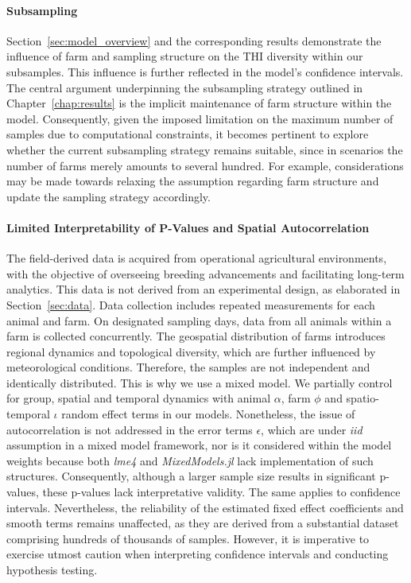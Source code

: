 \paragraph{Subsampling}
Section~\ref{sec:model_overview} and the corresponding results demonstrate the influence of farm and sampling structure on the THI diversity within our subsamples. This influence is further reflected in the model's confidence intervals. The central argument underpinning the subsampling strategy outlined in Chapter~\ref{chap:results} is the implicit maintenance of farm structure within the model. Consequently, given the imposed limitation on the maximum number of samples due to computational constraints, it becomes pertinent to explore whether the current subsampling strategy remains suitable, since in scenarios the number of farms merely amounts to several hundred. For example, considerations may be made towards relaxing the assumption regarding farm structure and update the sampling strategy accordingly.

\paragraph{Limited Interpretability of P-Values and Spatial Autocorrelation} The field-derived data is acquired from operational agricultural environments, with the objective of overseeing breeding advancements and facilitating long-term analytics. This data is not derived from an experimental design, as elaborated in Section~\ref{sec:data}. Data collection includes repeated measurements for each animal and farm. On designated sampling days, data from all animals within a farm is collected concurrently. The geospatial distribution of farms introduces regional dynamics and topological diversity, which are further influenced by meteorological conditions. Therefore, the samples are not independent and identically distributed. This is why we use a mixed model. We partially control for group, spatial and temporal dynamics with animal $\alpha$, farm $\phi$ and spatio-temporal $\iota$ random effect terms in our models. Nonetheless, the issue of autocorrelation is not addressed in the error terms $\epsilon$, which are under \textit{iid} assumption in a mixed model framework, nor is it considered within the model weights because both \textit{lme4} and \textit{MixedModels.jl} lack implementation of such structures. Consequently, although a larger sample size results in significant p-values, these p-values lack interpretative validity. The same applies to confidence intervals. Nevertheless, the reliability of the estimated fixed effect coefficients and smooth terms remains unaffected, as they are derived from a substantial dataset comprising hundreds of thousands of samples. However, it is imperative to exercise utmost caution when interpreting confidence intervals and conducting hypothesis testing.

